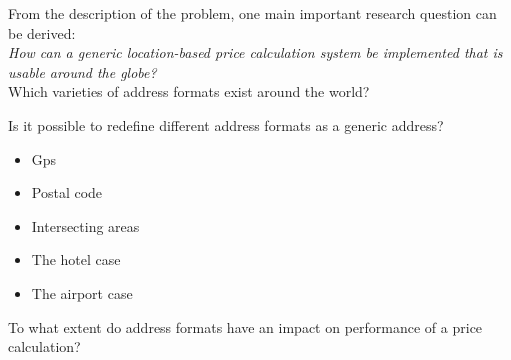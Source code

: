 From the description of the problem, one main important research question can be derived: \\

\textit{How can a generic location-based price calculation system be implemented that is usable around the globe?} \\

Which varieties of address formats exist around the world?

Is it possible to redefine different address formats as a generic address?

\begin{itemize}
  \item Gps
  \item Postal code
  \item Intersecting areas
  \item The hotel case
  \item The airport case
\end{itemize}

To what extent do address formats have an impact on performance of a price calculation?

